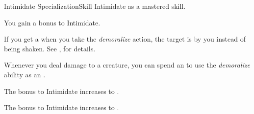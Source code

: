     \begin{feat}{Intimidate Specialization}{Skill}
        \featpre Intimidate as a mastered skill.
        \featben

         You gain a  bonus to Intimidate.

         If you get a  when you take the \textit{demoralize} action, the target is \frightened by you instead of being shaken.
        See , for details.

         Whenever you deal damage to a creature, you can spend an  to use the \textit{demoralize} ability as an .

         The bonus to Intimidate increases to .

         The bonus to Intimidate increases to .
    \end{feat}


